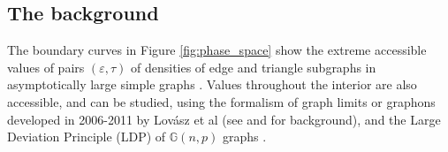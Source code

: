 \documentclass[12pt]{amsart}
\newcommand{\tdens}{\tau}
\newcommand{\edens}{\varepsilon}
\newcommand{\G}{\mathbb{G}}
\begin{document}

\subsection{\label{Background} {The background}} 
The boundary curves in Figure \ref{fig:phase_space} show the extreme accessible values of pairs $(\edens,\tdens)$ of densities of edge and triangle subgraphs in asymptotically large simple graphs \cite{Raz}. Values throughout the interior are also accessible, and can be studied, using the formalism of graph limits or graphons developed in 2006-2011 by Lov\'{a}sz et al \cite{BCL,BCLSV,LS1,LS2,LS3} (see \cite{Au, DJ} and \cite{Lov} for background), and the Large Deviation Principle (LDP) of $\G(n,p)$ graphs \cite{CV}.

\end{document}
